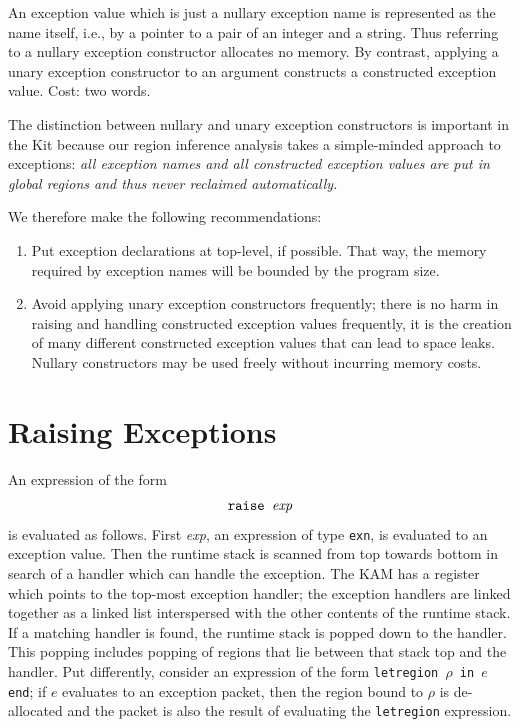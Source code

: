 \documentclass[12pt]{book}
\begin{document}
An exception value which is just a nullary exception name is
represented as the name itself, i.e., by a pointer to a pair
of an integer and a string. Thus referring to a nullary exception
constructor allocates no memory. By contrast, applying a unary 
exception constructor to an argument constructs a constructed
exception value. Cost: two words.

The distinction between nullary and unary exception constructors
is important in the Kit because our region inference analysis
takes a simple-minded approach to exceptions: {\em all exception
names and all constructed exception values are put in global regions and thus
never reclaimed automatically.}

We therefore make the following recommendations:
\begin{enumerate}
\item Put exception declarations at top-level, if possible.
      That way, the memory required by exception names will
       be bounded by the program size.
\item Avoid applying unary exception constructors frequently; there is
      no harm in raising and handling constructed exception values frequently,
      it is the creation of many different constructed exception values
      that can lead to space leaks. Nullary
      constructors may be used freely without incurring memory costs.
\end{enumerate}
\section{Raising Exceptions}
An expression of the form 
$$\hbox{\tt raise {\it exp}}$$
is evaluated as follows. First {\it exp}, an expression of 
type {\tt exn}, is evaluated to an exception value. Then the runtime
stack is scanned from top towards bottom in search of a handler
which can handle the exception. The KAM has a register which points
to the top-most exception handler; the exception handlers are linked
together as a linked list interspersed with the other contents of
the runtime stack. If a matching handler is found, the runtime stack
is popped down to the handler. This popping includes popping of regions
that lie between that stack top and the handler. Put differently,
consider an expression of the form 
{\tt letregion $\rho$ in $e$ end}; if $e$ evaluates to an exception packet,
then the region bound to $\rho$ is de-allocated and the packet is also
the result of evaluating the \texttt{letregion} expression.
\end{document}

